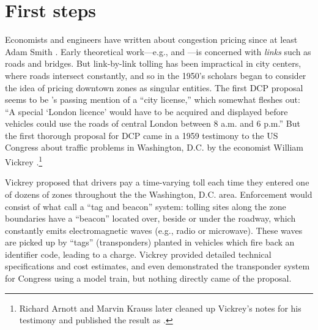 \section{First steps}\label{sec:early}

Economists and engineers have written about congestion pricing since at least Adam Smith \citep{Lindsey2006}. Early theoretical work---e.g., \citet{Pigou1920} and \citet{Beckmann1956}---is concerned with \emph{links} such as roads and bridges. But link-by-link tolling has been impractical in city centers, where roads intersect constantly, and so in the 1950's scholars began to consider the idea of pricing downtown zones as singular entities. The first DCP proposal seems to be \citet{buchanan1952}'s passing mention of a ``city license,'' which \citet{Walters1954} somewhat fleshes out: ``A special `London licence' would have to be acquired and displayed before vehicles could use the roads of central London between 8 a.m. and 6 p.m.'' But the first thorough proposal for DCP came in a 1959 testimony to the US Congress about traffic problems in Washington, D.C. by the economist William Vickrey \citep{Vickrey1959}.\footnote{Richard Arnott and Marvin Krauss later cleaned up Vickrey's notes for his testimony and published the result as \citet{Vickrey1994}.}

Vickrey proposed that drivers pay a time-varying toll each time they entered one of dozens of zones throughout the the Washington, D.C. area. Enforcement would consist of what \citet{DePalma2011} call a ``tag and beacon'' system: tolling sites along the zone boundaries have a ``beacon'' located over, beside or under the roadway, which constantly emits electromagnetic waves (e.g., radio or microwave). These waves are picked up by ``tags'' (transponders) planted in vehicles which fire back an identifier code, leading to a charge. Vickrey provided detailed technical specifications and cost estimates, and even demonstrated the transponder system for Congress using a model train, but nothing directly came of the proposal.

